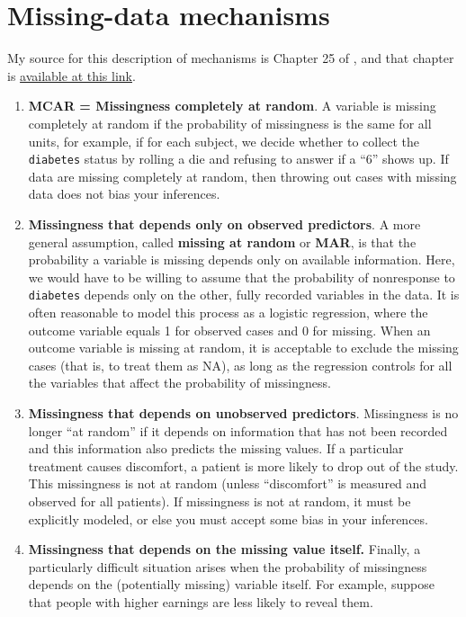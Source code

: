 \documentclass[]{book}
\providecommand{\tightlist}{%
  \setlength{\itemsep}{0pt}\setlength{\parskip}{0pt}}
\theoremstyle{definition}
\theoremstyle{definition}
\theoremstyle{definition}
\theoremstyle{remark}
\begin{document}
\section{Missing-data mechanisms}\label{missing-data-mechanisms}

My source for this description of mechanisms is Chapter 25 of
\citet{GelmanHill2007}, and that chapter is
\href{http://www.stat.columbia.edu/~gelman/arm/missing.pdf}{available at
this link}.

\begin{enumerate}
\def\labelenumi{\arabic{enumi}.}
\tightlist
\item
  \textbf{MCAR = Missingness completely at random}. A variable is
  missing completely at random if the probability of missingness is the
  same for all units, for example, if for each subject, we decide
  whether to collect the \texttt{diabetes} status by rolling a die and
  refusing to answer if a ``6'' shows up. If data are missing completely
  at random, then throwing out cases with missing data does not bias
  your inferences.
\item
  \textbf{Missingness that depends only on observed predictors}. A more
  general assumption, called \textbf{missing at random} or \textbf{MAR},
  is that the probability a variable is missing depends only on
  available information. Here, we would have to be willing to assume
  that the probability of nonresponse to \texttt{diabetes} depends only
  on the other, fully recorded variables in the data. It is often
  reasonable to model this process as a logistic regression, where the
  outcome variable equals 1 for observed cases and 0 for missing. When
  an outcome variable is missing at random, it is acceptable to exclude
  the missing cases (that is, to treat them as NA), as long as the
  regression controls for all the variables that affect the probability
  of missingness.
\item
  \textbf{Missingness that depends on unobserved predictors}.
  Missingness is no longer ``at random'' if it depends on information
  that has not been recorded and this information also predicts the
  missing values. If a particular treatment causes discomfort, a patient
  is more likely to drop out of the study. This missingness is not at
  random (unless ``discomfort'' is measured and observed for all
  patients). If missingness is not at random, it must be explicitly
  modeled, or else you must accept some bias in your inferences.
\item
  \textbf{Missingness that depends on the missing value itself.}
  Finally, a particularly difficult situation arises when the
  probability of missingness depends on the (potentially missing)
  variable itself. For example, suppose that people with higher earnings
  are less likely to reveal them.
\end{enumerate}
\end{document}
